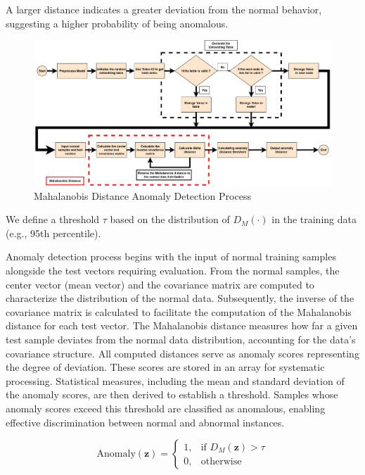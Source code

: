 \begin{ZhChapter}
    A larger distance indicates a greater deviation from the normal behavior, suggesting a higher probability of being anomalous.



    \begin{figure}[htbp]
        \centering
        \includegraphics[width = 1\textwidth]{image/MD.jpg}
        \caption{Mahalanobis Distance Anomaly Detection Process}
        \label{fig:EmbeddingFlow}
    \end{figure}


    \newpage
    We define a threshold $\tau$ based on the distribution of $D_M(\cdot)$ in the training data (e.g., 95th percentile).


    Anomaly detection process begins with the input of normal training samples alongside the test vectors requiring evaluation. From the normal samples, the center vector (mean vector) and the covariance matrix are computed to characterize the distribution of the normal data. Subsequently, the inverse of the covariance matrix is calculated to facilitate the computation of the Mahalanobis distance for each test vector. The Mahalanobis distance measures how far a given test sample deviates from the normal data distribution, accounting for the data's covariance structure. All computed distances serve as anomaly scores representing the degree of deviation. These scores are stored in an array for systematic processing. Statistical measures, including the mean and standard deviation of the anomaly scores, are then derived to establish a threshold. Samples whose anomaly scores exceed this threshold are classified as anomalous, enabling effective discrimination between normal and abnormal instances.



    \begin{equation}
        \text{Anomaly}(\mathbf{z}) =
        \begin{cases}
            1, & \text{if } D_M(\mathbf{z}) > \tau \\
            0, & \text{otherwise}
        \end{cases}
    \end{equation}


\end{ZhChapter}
